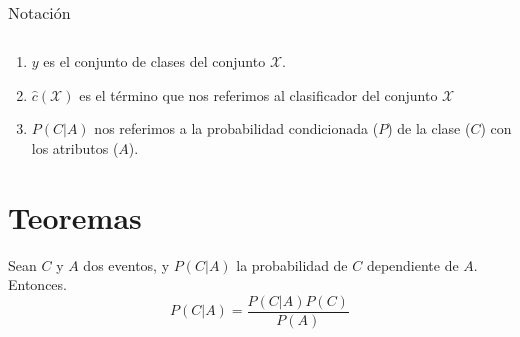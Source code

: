 \begin{table}[ht!]
\begin{center}
\begin{tabularx}{\textwidth}{|l|X|}
                                                                                                                                 &                                                                                                                                                                             \\ \hline
        \end{tabularx}
        \caption{Notación}
        \label{tab:nnotation}
    \end{center}
\end{table}



\begin{enumerate}


    \item $y$ es el conjunto de clases del conjunto $\mathcal{X}$.
    \item $\hat{c}(\mathcal{X})$ es el término que nos referimos al clasificador del conjunto $\mathcal{X}$
    \item $P(C|A)$ nos referimos a la probabilidad condicionada ($P$) de la clase ($C$) con los atributos ($A$).
\end{enumerate}


\chapter*{Teoremas}


\begin{theorem}[Bayes]
    \label{theorem:bayes}
    Sean $C$ y $A$ dos eventos, y $P(C|A)$ la probabilidad de $C$ dependiente de $A$. Entonces.
    \[ P(C|A) = \frac{P(C|A) P(C)}{P(A)} \]
\end{theorem}
